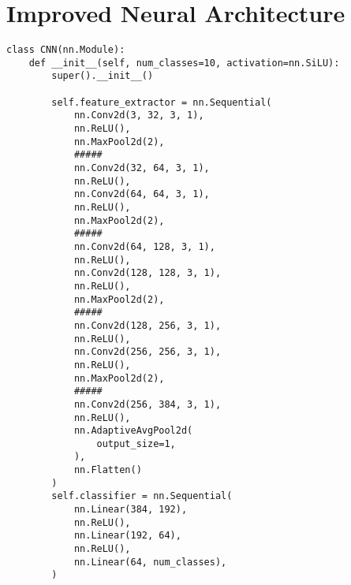 \documentclass{article} %
\begin{document}
\section{Improved Neural Architecture}
\label{app:improvedArchitecture}
\begin{lstlisting}
class CNN(nn.Module):
    def __init__(self, num_classes=10, activation=nn.SiLU):
        super().__init__()

        self.feature_extractor = nn.Sequential(
            nn.Conv2d(3, 32, 3, 1),
            nn.ReLU(),  
            nn.MaxPool2d(2),
            #####
            nn.Conv2d(32, 64, 3, 1),
            nn.ReLU(),
            nn.Conv2d(64, 64, 3, 1),
            nn.ReLU(),
            nn.MaxPool2d(2),
            #####
            nn.Conv2d(64, 128, 3, 1),
            nn.ReLU(),
            nn.Conv2d(128, 128, 3, 1),
            nn.ReLU(),
            nn.MaxPool2d(2),
            #####
            nn.Conv2d(128, 256, 3, 1),
            nn.ReLU(),
            nn.Conv2d(256, 256, 3, 1),
            nn.ReLU(),
            nn.MaxPool2d(2),
            #####
            nn.Conv2d(256, 384, 3, 1),
            nn.ReLU(),
            nn.AdaptiveAvgPool2d(
                output_size=1,
            ),
            nn.Flatten()
        )
        self.classifier = nn.Sequential(
            nn.Linear(384, 192),            
            nn.ReLU(),
            nn.Linear(192, 64),            
            nn.ReLU(),
            nn.Linear(64, num_classes),
        )    

\end{lstlisting}

\end{document}
